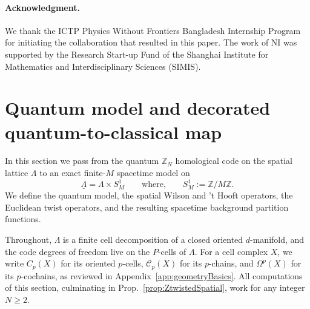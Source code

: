 %	
%	





\paragraph{Acknowledgment.}
We thank the ICTP Physics Without Frontiers Bangladesh Internship Program for initiating the collaboration that resulted in this paper. The work of NI was supported by the Research Start-up Fund of the Shanghai Institute for Mathematics and Interdisciplinary Sciences (SIMIS).






\section{Quantum model and decorated quantum-to-classical map}
\label{sec:quantum-classical}

In this section we pass from the quantum \(\mathbb Z_N\) homological code on the spatial
lattice \(\Lambda\) to an exact finite-\(M\) spacetime model on
\begin{equation}
\underline\Lambda=\Lambda\times S^1_M \qquad \text{where,} \qquad S_M^1 := \mathbb Z/M\mathbb Z.
\end{equation}
We define the quantum model, the spatial
Wilson and 't Hooft operators, the Euclidean twist operators, and the resulting spacetime
background partition functions.

Throughout, \(\Lambda\) is a finite cell decomposition of a closed
oriented \(d\)-manifold, and the code degrees of freedom live on the \(P\)-cells of
\(\Lambda\). For a cell complex \(X\), we write \(C_p(X)\) for its oriented
\(p\)-cells, \(\mathcal C_p(X)\) for its \(p\)-chains, and \(\Omega^p(X)\) for its
\(p\)-cochains, as reviewed in Appendix~\ref{app:geometryBasics}. All computations of this section, culminating in Prop.~\ref{prop:ZtwistedSpatial}, work for any integer $N \ge 2$.


